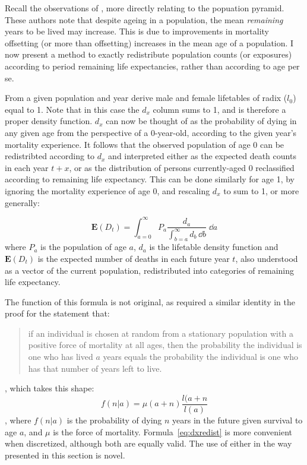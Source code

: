 
Recall the observations of \citet{sanderson2005average}, more directly
relating to the popuation pyramid. These authors note that despite ageing in a
population, the mean \textit{remaining} years to be lived may increase. This is due 
to improvements in mortality offsetting (or more than offsetting) increases in
the mean age of a population. I now present a method to exactly redistribute
population counts (or exposures) according to period remaining life
expectancies, rather than according to age per se.

From a given population and year derive male and female lifetables of radix
($l_0$) equal to 1. Note that in this case the $d_x$ column sums to 1, and is therefore a
proper density function. $d_x$ can now be thought of as the probability of dying 
in any given age from the perspective of a 0-year-old, according to the given year's mortality
experience. It follows that the observed population of age 0 can be redistribted
according to $d_x$ and interpreted either as the expected death counts
in each year $t+x$, or as the distribution of persons currently-aged 0
reclassified according to remaining life expectancy. This can be done similarly
for age 1, by ignoring the mortality experience of age 0, and rescaling $d_x$ to
sum to 1, or more generally:

\begin{equation}
\label{eq:dxredist}
\mathbf{E}(D_t) = \int _{a = 0} ^{\infty} P_a \frac{d_a}{\int _{b = a} ^{\infty}
d_b\, \dd b} \;\dd a
\end{equation}
where $P_a$ is the population of age $a$, $d_a$ is the
lifetable density function and $\mathbf{E}(D_t)$ is the expected number of
deaths in each future year $t$, also understood as a vector of the current 
population, redistributed into categories of remaining life expectancy. 

The function of this formula is not original, as \citet{vaupel2009life} required
a similar identity in the proof for the statement that:
\begin{quotation}
if an individual is chosen at random from a stationary population with a positive force
of mortality at all ages, then the probability the individual is one who has lived $a$ years
equals the probability the individual is one who has that number of years left to live.
\end{quotation}
, which takes this shape:
\begin{equation}
f(n | a) = \mu (a+n) \frac{l(a+n}{l(a)}
\end{equation}
, where $f(n | a) $ is the probability of dying $n$ years in the future given
survival to age $a$, and $\mu$ is the force of mortality.
Formula~\eqref{eq:dxredist} is more convenient when
discretized, although both are equally valid. The use of either in the way
presented in this section is novel.

